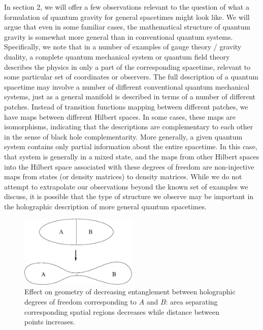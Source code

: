 \documentclass[12pt,epsf]{article}
\renewcommand{\(}{\left(}
\renewcommand{\)}{\right)}
\begin{document}
In section 2, we will offer a few observations relevant to the question of what a formulation of quantum gravity for general spacetimes might look like. We will argue that even in some familiar cases, the mathematical structure of quantum gravity is somewhat more general than in conventional quantum systems. Specifically, we note that in a number of examples of gauge theory / gravity duality, a complete quantum mechanical system or quantum field theory describes the physics in only a part of the corresponding spacetime, relevant to some particular set of coordinates or observers. The full description of a quantum spacetime may involve a number of different conventional quantum mechanical systems, just as a general manifold is described in terms of a number of different patches. Instead of transition functions mapping between different patches, we have maps between different Hilbert spaces. In some cases, these maps are isomorphisms, indicating that the descriptions are complementary to each other in the sense of black hole complementarity. More generally, a given quantum system contains only partial information about the entire spacetime. In this case, that system is generally in a mixed state, and the maps from other Hilbert spaces into the Hilbert space associated with these degrees of freedom are non-injective maps from states (or density matrices) to density matrices. While we do not attempt to extrapolate our observations beyond the known set of examples we discuss, it is possible that the type of structure we observe may be important in the holographic description of more general quantum spacetimes.

\begin{figure}
\centering
\includegraphics[width=0.5\textwidth]{pinch.eps}
\caption{Effect on geometry of decreasing entanglement between holographic degrees of freedom corresponding to $A$ and $B$: area separating corresponding spatial regions decreases while distance between points increases. }
\end{figure}
\end{document}
